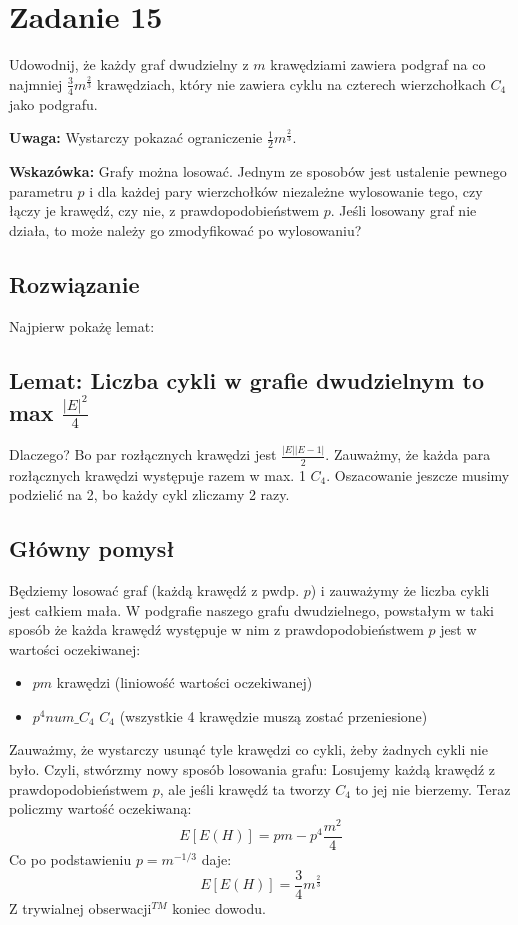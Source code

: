 \section{Zadanie 15}
Udowodnij, że każdy graf dwudzielny z \(m\) krawędziami zawiera podgraf na
co najmniej \(\frac{3}{4} m^{\frac{2}{3}}\) krawędziach, który nie zawiera cyklu na czterech
wierzchołkach \(C_4\) jako podgrafu.

\vspace{0.5em}

\textbf{Uwaga:} Wystarczy pokazać ograniczenie \(\frac{1}{2} m^{\frac{2}{3}}\).

\vspace{0.5em}

\textbf{Wskazówka:} Grafy można losować. Jednym ze sposobów jest ustalenie
pewnego parametru \(p\) i dla każdej pary wierzchołków niezależne wylosowanie
tego, czy łączy je krawędź, czy nie, z prawdopodobieństwem \(p\). Jeśli
losowany graf nie działa, to może należy go zmodyfikować po wylosowaniu?


\subsection*{Rozwiązanie}
Najpierw pokażę lemat:
\subsection{Lemat: Liczba cykli w grafie dwudzielnym to max \(\frac{|E|^2}{4}\)}
Dlaczego? Bo par rozłącznych krawędzi jest \(\frac{|E||E-1|}{2}\). Zauważmy, że każda para rozłącznych krawędzi występuje razem w max. 1 \(C_4\). Oszacowanie jeszcze musimy podzielić na 2, bo każdy cykl zliczamy 2 razy.
\subsection{Główny pomysł}
Będziemy losować graf (każdą krawędź z pwdp. \(p\)) i zauważymy że liczba cykli jest całkiem mała. W podgrafie naszego grafu dwudzielnego, powstałym w taki sposób że każda krawędź występuje w nim z prawdopodobieństwem \(p\) jest w wartości oczekiwanej:
\begin{itemize}
	\item \(pm\) krawędzi (liniowość wartości oczekiwanej)
	\item \(p^4num\_C_4\) \(C_4\) (wszystkie 4 krawędzie muszą zostać przeniesione)
\end{itemize}
Zauważmy, że wystarczy usunąć tyle krawędzi co cykli, żeby żadnych cykli nie było. Czyli, stwórzmy nowy sposób losowania grafu: Losujemy każdą krawędź z prawdopodobieństwem \(p\), ale jeśli krawędź ta tworzy \(C_4\) to jej nie bierzemy. Teraz policzmy wartość oczekiwaną:
\[E[E(H)] = pm - p^4\frac{m^2}{4}\]
Co po podstawieniu \(p = m^{-1/3}\) daje:
\[E[E(H)] = \frac{3}{4} m^\frac{2}{3}\]
Z trywialnej obserwacji\(^{TM}\) koniec dowodu.

